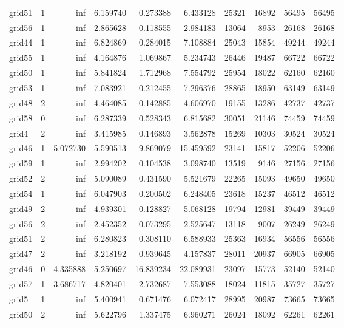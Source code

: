 \begin{longtable}{|l|r|r|r|r|r|r|r|r|r|}
grid51 & 1 & inf & 6.159740 & 0.273388 & 6.433128 & 25321 & 16892 & 56495 & 56495 \\
grid56 & 1 & inf & 2.865628 & 0.118555 & 2.984183 & 13064 & 8953 & 26168 & 26168 \\
grid44 & 1 & inf & 6.824869 & 0.284015 & 7.108884 & 25043 & 15854 & 49244 & 49244 \\
grid55 & 1 & inf & 4.164876 & 1.069867 & 5.234743 & 26446 & 19487 & 66722 & 66722 \\
grid50 & 1 & inf & 5.841824 & 1.712968 & 7.554792 & 25954 & 18022 & 62160 & 62160 \\
grid53 & 1 & inf & 7.083921 & 0.212455 & 7.296376 & 28865 & 18950 & 63149 & 63149 \\
grid48 & 2 & inf & 4.464085 & 0.142885 & 4.606970 & 19155 & 13286 & 42737 & 42737 \\
grid58 & 0 & inf & 6.287339 & 0.528343 & 6.815682 & 30051 & 21146 & 74459 & 74459 \\
grid4 & 2 & inf & 3.415985 & 0.146893 & 3.562878 & 15269 & 10303 & 30524 & 30524 \\
grid46 & 1 & 5.072730 & 5.590513 & 9.869079 & 15.459592 & 23141 & 15817 & 52206 & 52206 \\
grid59 & 1 & inf & 2.994202 & 0.104538 & 3.098740 & 13519 & 9146 & 27156 & 27156 \\
grid52 & 2 & inf & 5.090089 & 0.431590 & 5.521679 & 22265 & 15093 & 49650 & 49650 \\
grid54 & 1 & inf & 6.047903 & 0.200502 & 6.248405 & 23618 & 15237 & 46512 & 46512 \\
grid49 & 2 & inf & 4.939301 & 0.128827 & 5.068128 & 19794 & 12981 & 39449 & 39449 \\
grid56 & 2 & inf & 2.452352 & 0.073295 & 2.525647 & 13118 & 9007 & 26249 & 26249 \\
grid51 & 2 & inf & 6.280823 & 0.308110 & 6.588933 & 25363 & 16934 & 56556 & 56556 \\
grid47 & 2 & inf & 3.218192 & 0.939645 & 4.157837 & 28011 & 20937 & 66905 & 66905 \\
grid46 & 0 & 4.335888 & 5.250697 & 16.839234 & 22.089931 & 23097 & 15773 & 52140 & 52140 \\
grid57 & 1 & 3.686717 & 4.820401 & 2.732687 & 7.553088 & 18024 & 11815 & 35727 & 35727 \\
grid5 & 1 & inf & 5.400941 & 0.671476 & 6.072417 & 28995 & 20987 & 73665 & 73665 \\
grid50 & 2 & inf & 5.622796 & 1.337475 & 6.960271 & 26024 & 18092 & 62261 & 62261 \\

\end{longtable}
